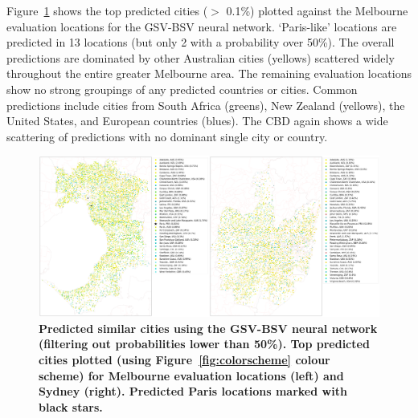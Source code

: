 \documentclass[Crown,sageh,times]{sagej}
\begin{document}
Figure~\ref{fig:melstreet} shows the top predicted cities ($>$ 0.1\%) plotted against the Melbourne evaluation locations for the GSV-BSV neural network. `Paris-like' locations are predicted in 13 locations (but only 2 with a probability over 50\%). The overall predictions are dominated by other Australian cities (yellows) scattered widely throughout the entire greater Melbourne area. The remaining evaluation locations show no strong groupings of any predicted countries or cities. Common predictions include cities from South Africa (greens), New Zealand (yellows), the United States, and European countries (blues). The CBD again shows a wide scattering of predictions with no dominant single city or country.





\begin{figure}[!htbp]
\centering   
\includegraphics[scale=0.10]{Images/Figure6GSV.png} 
\caption{ \bf Predicted similar cities using the GSV-BSV neural network (filtering out probabilities lower than 50\%). Top predicted cities plotted (using Figure~\ref{fig:colorscheme} colour scheme) for Melbourne evaluation locations (left) and Sydney (right). Predicted Paris locations marked with black stars.}    
 \label{fig:melstreet}  
\end{figure} 
\end{document}

